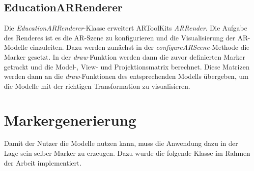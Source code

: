\subsection{EducationARRenderer}
Die \textit{EducationARRenderer}-Klasse erweitert ARToolKits \textit{ARRender}. Die Aufgabe des Renderes ist es die AR-Szene zu konfigurieren und die Visualisierung der AR-Modelle einzuleiten. Dazu werden zunächst in der \textit{configureARScene}-Methode die Marker gesetzt. In der \textit{draw}-Funktion werden dann die zuvor definierten Marker getrackt und die Model-, View- und Projektionsmatrix berechnet. Diese Matrizen werden dann an die \textit{draw}-Funktionen des entsprechenden Modells übergeben, um die Modelle mit der richtigen Transformation zu visualisieren.\\

\section{Markergenerierung}
Damit der Nutzer die Modelle nutzen kann, muss die Anwendung dazu in der Lage sein selber Marker zu erzeugen. Dazu wurde die folgende Klasse im Rahmen der Arbeit implementiert. 
